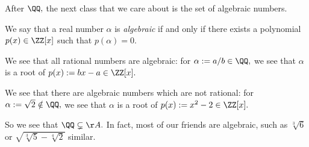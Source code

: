 \documentclass[../notes.tex]{subfiles}
\begin{document}
After $\QQ,$ the next class that we care about is the set of algebraic numbers.
\begin{defi}[Algebraic]
	We say that a real number $\alpha$ is \textit{algebraic} if and only if there exists a polynomial $p(x)\in\ZZ[x]$ such that $p(\alpha)=0.$
\end{defi}
\begin{ex}
	We see that all rational numbers are algebraic: for $\alpha:=a/b\in\QQ,$ we see that $\alpha$ is a root of $p(x):=bx-a\in\ZZ[x].$
\end{ex}
\begin{ex}
	We see that there are algebraic numbers which are not rational: for $\alpha:=\sqrt2\notin\QQ,$ we see that $\alpha$ is a root of $p(x):=x^2-2\in\ZZ[x].$
\end{ex}
So we see that $\QQ\subsetneq\AA.$ In fact, most of our friends are algebraic, such as $\sqrt[3]6$ or $\sqrt{\sqrt[3]5-\sqrt[4]2}$ similar.
\end{document}
